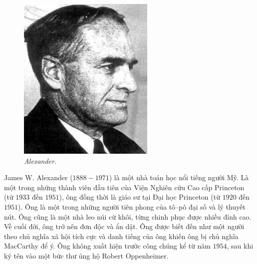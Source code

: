 \begin{multicols}{2}
\begin{tBox}
\begin{figure}
						\hspace*{2pt}\includegraphics[width= 1.1\linewidth]{fig_Alexander}
						\caption{\small\textit{\color{duongvaotoanhoc}Alexander.}}
						\vspace*{-10pt}
					\end{figure}
				James W. Alexander ($1888-1971$) là một nhà toán học nổi tiếng người Mỹ. Là một trong những thành viên đầu tiên của Viện Nghiên cứu Cao cấp Princeton (từ $1933$ đến $1951$), ông đồng thời là giáo sư tại Đại học Princeton (từ $1920$ đến $1951$). Ông là một trong những người tiên phong của tô--pô đại số và lý thuyết nút. Ông cũng là một nhà leo núi cừ khôi, từng chinh phục được nhiều đỉnh cao. Về cuối đời, ông trở nên đơn độc và ẩn dật. Ông được biết đến như một người theo chủ nghĩa xã hội tích cực và danh tiếng của ông khiến ông bị chủ nghĩa MacCarthy để ý. Ông không xuất hiện trước công chúng kể từ năm $1954$, sau khi ký tên vào một bức thư ủng hộ Robert Oppenheimer.
			\end{tBox}
	

\end{multicols}

